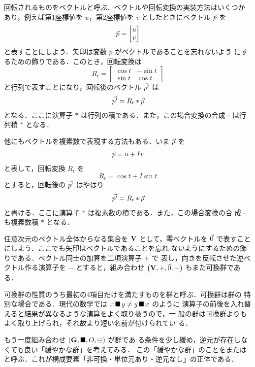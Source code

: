\documentclass[a5paper,twoside,fleqn,draft]{jsbook}
\begin{document}
回転されるものをベクトルと呼ぶ．ベクトルや回転変換の実装方法はいくつか
あり，例えば第1座標値を $u$，第2座標値を $v$ としたときにベクトル
$\Vec{p}$ を
\begin{equation}
\Vec{p}=\begin{bmatrix}u\\v\end{bmatrix}
\end{equation}
と表すことにしよう．矢印は変数 $p$ がベクトルであることを忘れないよう
にするための飾りである．このとき，回転変換は
\begin{equation}
R_t=\begin{bmatrix}\cos t&-\sin t\\\sin t&\cos t\end{bmatrix}
\end{equation}
と行列で表すことになり，回転後のベクトル $\Vec{p'}$ は
\begin{equation}
\Vec{p'}=R_t*\Vec{p}
\end{equation}
となる．ここに演算子 $*$ は行列の積である．また，この場合変換の合成
$\operatorname{\cdot}$ は行列積 $*$ となる．

他にもベクトルを複素数で表現する方法もある．いま $\Vec{p}$ を
\begin{equation}
\Vec{p}=u+I v
\end{equation}
と表して，回転変換 $R_t$ を
\begin{equation}
R_t=\cos t+I\sin t
\end{equation}
とすると，回転後の $\Vec{p'}$ はやはり
\begin{equation}
\Vec{p'}=R_t*\Vec{p}
\end{equation}
と書ける．ここに演算子 $*$ は複素数の積である．また，この場合変換の合
成 $\operatorname{\cdot}$ も複素数積 $*$ となる．

任意次元のベクトル全体からなる集合を $\mathbf{V}$ として，零ベクトルを
$\Vec{0}$ で表すことにしよう．ここでも矢印はベクトルであることを忘れ
ないようにするための飾りである．ベクトル同士の加算を二項演算子 $+$ で
表し，向きを反転させた逆ベクトル作る演算子を $-$ とすると，組み合わせ
$\left(\mathbf{V},+,\Vec{0},-\right)$ もまた可換群である．

可換群の性質のうち最初の4項目だけを満たすものを群と呼ぶ．可換群は群の
特別な場合である．現代の数学では $\hVar{x}\hAnyBinOp y\neq y\hAnyBinOp x$ のように
演算子の前後を入れ替えると結果が異なるような演算をよく取り扱うので，一
般の群は可換群よりもよく取り上げられ，それ故より短い名前が付けられてい
る．

もう一度組み合わせ $\left(\mathbf{G},\operatorname{\blacksquare},O,\operatorname{\ominus}\right)$ が群であ
る条件を少し緩め，逆元が存在しなくても良い「緩やかな群」を考えてみる．
この「緩やかな群」のことをまたは
と呼ぶ．これが構成要素「非可換・単位元あり・逆元なし」の正体である．
\end{document}

